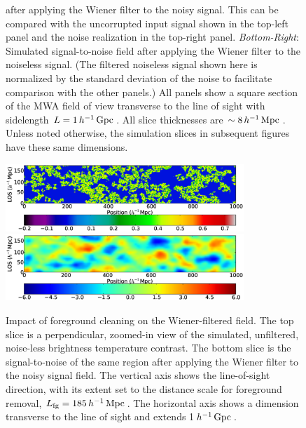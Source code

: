 \begin{figure}[t]
{    after applying the Wiener filter to the noisy
    signal. This can be compared with the uncorrupted input signal shown
in the top-left panel and the noise realization in the top-right panel. \textit{Bottom-Right}: Simulated signal-to-noise field after applying the Wiener filter to the noiseless signal. (The filtered noiseless signal shown here is normalized by the standard deviation of the noise to facilitate comparison with the other panels.) All panels show a square section of the MWA field of
    view transverse to the line of sight with sidelength $L = 1 \,h^{-1}\,{\rm Gpc}\,$. All slice thicknesses are $\sim 8 \,h^{-1}\,{\rm Mpc}\,$. Unless noted otherwise, the simulation slices in subsequent figures have these same dimensions.}
  \label{fig:Wiener}
\end{figure}

\begin{figure}[h]
  \centering
  \includegraphics[width=9cm]{f3a.eps}
  \includegraphics[width=9cm]{f3b.eps}
  \caption{Impact of foreground cleaning on the Wiener-filtered field. The top slice is a perpendicular, zoomed-in view of the simulated, unfiltered, noise-less brightness temperature contrast. 
The bottom slice is the signal-to-noise of the same region after applying the
    Wiener filter to the noisy signal field. The vertical axis shows the
    line-of-sight direction, with its extent set to the
    distance scale for foreground removal, $L_{\text{fg}} = 185\,h^{-1}\,{\rm Mpc}\,$. The horizontal axis shows a dimension transverse to the line of sight and extends 1$\,h^{-1}\,{\rm Gpc}\,$. }
  \label{fig:WienerLOS}
\end{figure}


